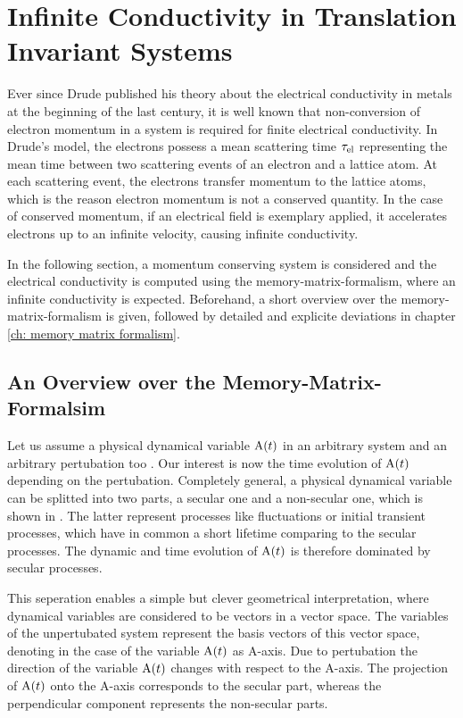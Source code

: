 %
%
%
\chapter{Infinite Conductivity in Translation Invariant Systems}
\label{ch:infinite conductivity}
%
%
%
Ever since Drude published his theory about the electrical conductivity in metals \cite{Drude} at the beginning of the last century, it is well known that non-conversion of electron momentum in a system is required for finite electrical conductivity.
In Drude's model, the electrons possess a mean scattering time $\tau_{\mathrm{el}}$ representing the mean time between two scattering events of an electron and a lattice atom.
At each scattering event, the electrons transfer momentum to the lattice atoms, which is the reason electron momentum is not a conserved quantity.
In the case of conserved momentum, if an electrical field is exemplary applied, it accelerates electrons up to an infinite velocity, causing infinite conductivity.

In the following section, a momentum conserving system is considered and the electrical conductivity is computed using the memory-matrix-formalism, where an infinite conductivity is expected.
Beforehand, a short overview over the memory-matrix-formalism is given, followed by detailed and explicite deviations in chapter \ref{ch: memory matrix formalism}.
%
%
\section{An Overview over the Memory-Matrix-Formalsim}
\label{sec:overview MMF}
%
%
Let us assume a physical dynamical variable $\mathrm{A}(t)$ in an arbitrary system and an arbitrary pertubation too	.
Our interest is now the time evolution of $\mathrm{A}(t)$ depending on the pertubation.
Completely general, a physical dynamical variable can be splitted into two parts, a secular one and a non-secular one, which is shown in \cite{Mori}.
The latter represent processes like fluctuations or initial transient processes, which have in common a short lifetime comparing to the secular processes.
The dynamic and time evolution of $\mathrm{A}(t)$ is therefore dominated by secular processes.

This seperation enables a simple but clever geometrical interpretation, where dynamical variables are considered to be vectors in a vector space.
The variables of the unpertubated system represent the basis vectors of this vector space, denoting in the case of the variable $\mathrm{A}(t)$ as A-axis.
Due to pertubation the direction of the variable $\mathrm{A}(t)$ changes with respect to the A-axis.
The projection of $\mathrm{A}(t)$ onto the A-axis corresponds to the secular part, whereas the perpendicular component represents the non-secular parts.

